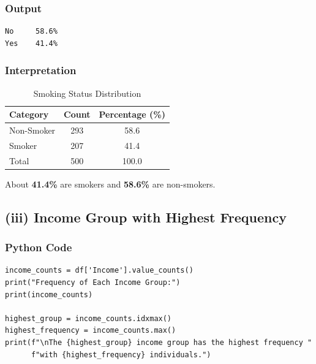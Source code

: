 \documentclass[12pt,a4paper]{article}
\begin{document}
\subsubsection{Output}

\begin{lstlisting}[style=outputstyle]
No     58.6%
Yes    41.4%
\end{lstlisting}

\subsubsection{Interpretation}

\begin{table}[H]
  \centering
  \caption{Smoking Status Distribution}
  \begin{tabular}{lcc}
    \toprule
    \textbf{Category} & \textbf{Count} & \textbf{Percentage (\%)} \\
    \midrule
    Non-Smoker & 293 & 58.6 \\
    Smoker     & 207 & 41.4 \\
    \midrule
    Total      & 500 & 100.0 \\
    \bottomrule
  \end{tabular}
\end{table}

About \textbf{41.4\%} are smokers and \textbf{58.6\%} are non-smokers.

\subsection{(iii) Income Group with Highest Frequency}

\subsubsection{Python Code}

\begin{lstlisting}[style=pythonstyle, caption={Income group frequency}]
income_counts = df['Income'].value_counts()
print("Frequency of Each Income Group:")
print(income_counts)

highest_group = income_counts.idxmax()
highest_frequency = income_counts.max()
print(f"\nThe {highest_group} income group has the highest frequency "
      f"with {highest_frequency} individuals.")
\end{lstlisting}
\end{document}
